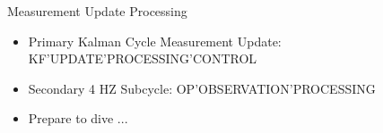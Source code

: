 \begin{frame}
Measurement Update Processing
 \begin{itemize}
 \item Primary Kalman Cycle Measurement Update: KF'UPDATE'PROCESSING'CONTROL
 \item Secondary 4 HZ Subcycle:  OP'OBSERVATION'PROCESSING
 \item Prepare to dive ...
\end{itemize}
\end{frame}
